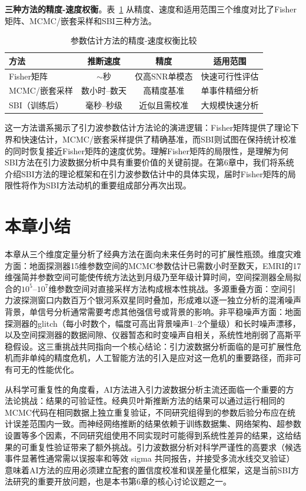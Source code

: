 \textbf{三种方法的精度-速度权衡}。表~\ref{tab:fisher_comparison} 从精度、速度和适用范围三个维度对比了Fisher矩阵、MCMC/嵌套采样和SBI三种方法。

\begin{table}[htbp]
\centering
\caption{参数估计方法的精度-速度权衡比较}
\label{tab:fisher_comparison}
\begin{tabular}{lccc}
\hline
\textbf{方法} & \textbf{推断速度} & \textbf{精度} & \textbf{适用范围} \\
\hline
Fisher矩阵 & $\sim$秒 & 仅高SNR单模态 & 快速可行性评估 \\
MCMC/嵌套采样 & 数小时--数天 & 高精度基准 & 单事件精细分析 \\
SBI（训练后） & 毫秒--秒级 & 近似且需校准 & 大规模快速分析 \\
\hline
\end{tabular}
\end{table}

这一方法谱系揭示了引力波参数估计方法论的演进逻辑：Fisher矩阵提供了理论下界和快速估计，MCMC/嵌套采样提供了精确基准，而SBI则试图在保持统计校准的同时恢复接近Fisher矩阵的速度优势。理解Fisher矩阵的局限性，是理解为何SBI方法在引力波数据分析中具有重要价值的关键前提。在第6章中，我们将系统介绍SBI方法的理论框架和在引力波参数估计中的具体实现，届时Fisher矩阵的局限性将作为SBI方法动机的重要组成部分再次出现。

\section{本章小结}

本章从三个维度定量分析了经典方法在面向未来任务时的可扩展性瓶颈。维度灾难方面：地面探测器15维参数空间的MCMC参数估计已需数小时至数天，EMRI的17维强简并参数空间可能使传统方法达到月级乃至年级计算时间，空间探测器全局拟合的$10^5$--$10^7$维参数空间对直接采样方法构成根本性挑战。多源重叠方面：空间引力波探测窗口内数百万个银河系双星同时叠加，形成难以逐一独立分析的混淆噪声背景，单信号分析通常需要考虑其他强信号或背景的影响。非平稳噪声方面：地面探测器的glitch（每小时数个，幅度可高出背景噪声1--2个量级）和长时噪声漂移，以及空间探测器的数据间隙、仪器暂态和时变噪声自相关，系统性地削弱了高斯平稳假设。这三重挑战共同指向一个核心结论：引力波数据分析面临的是可扩展性危机而非单纯的精度危机，人工智能方法的引入是应对这一危机的重要路径，而非可有可无的性能优化。

从科学可重复性的角度看，AI方法进入引力波数据分析主流还面临一个重要的方法论挑战：结果的可验证性。经典贝叶斯推断方法的结果可以通过运行相同的MCMC代码在相同数据上独立重复验证，不同研究组得到的参数后验分布应在统计误差范围内一致。而神经网络推断的结果依赖于训练数据集、网络架构、超参数设置等多个因素，不同研究组使用不同实现时可能得到系统性差异的结果，这给结果的可重复性验证带来了额外挑战。引力波数据分析对科学严谨性的高要求（候选事件显著性通常需以误报率和等效 sigma 共同报告，并接受多流水线交叉验证）意味着AI方法的应用必须建立配套的置信度校准和误差量化框架，这是当前SBI方法研究的重要开放问题，也是本书第6章的核心讨论议题之一。

